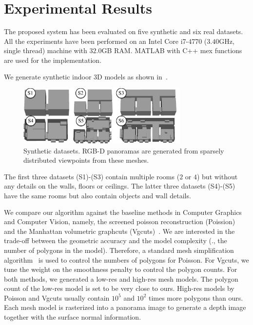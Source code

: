 \section{Experimental Results}
The proposed system has been evaluated on five synthetic and six real
datasets. All the experiments have been performed on an Intel Core
i7-4770 ($3.40$GHz, single thread) machine with $32.0$GB RAM. MATLAB
with C++ mex functions are used for the implementation.

 We generate synthetic indoor 3D models
as shown in~.
%
\begin{figure}[!t]
\begin{center}
\includegraphics[width=85mm]{../figures/synth3.pdf}
\end{center}
 \vspace{-0.3cm}
\caption{Synthetic datasets. RGB-D panoramas are generated from sparsely
distributed viewpoints from these meshes.}  \label{fig:synth}
 \vspace{-0.2cm}
\end{figure}
%
The first three datasets (S1)-(S3) contain multiple rooms ($2$ or $4$)
but without any details on the walls, floors or ceilings. The latter
three datasets (S4)-(S5) have the same rooms but also contain objects
and wall details.

We compare our algorithm against the baseline methods in Computer
Graphics and Computer Vision, namely, the screened poisson
reconstruction (Poission)~\cite{Kazhdan2013} and the Manhattan
volumetric graphcuts (Vgcuts)~\cite{furukawa-iccv-2009}. We are
interested in the trade-off between the geometric accuracy and the model
complexity (\eg., the number of polygons in the model). Therefore, a
standard mesh simplification algorithm~\cite{Tarini2010} is used to
control the numbers of polygons for Poisson. For Vgcuts, we tune the
weight on the smoothness penalty to control the polygon counts. For both
methods, we generated a low-res and high-res mesh models. The polygon
count of the low-res model is set to be very close to ours. High-res
models by Poisson and Vgcuts usually contain $10^5$ and $10^2$ times
more polygons than ours.
%
Each mesh
model is rasterized into a panorama image to generate a depth image
together with the surface normal information.

